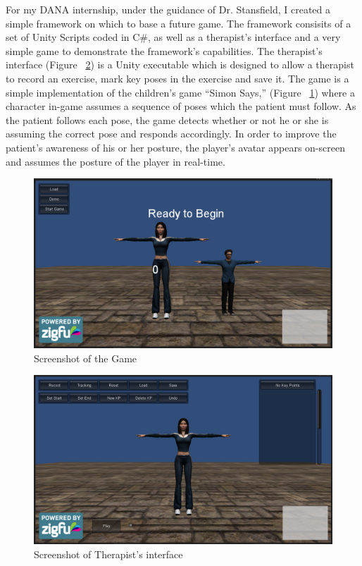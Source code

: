 \documentclass{report}
\begin{document}
For my DANA internship, under the guidance of Dr. Stansfield, I created a simple framework on which to base a future game. The framework consisits of a set of Unity Scripts coded in C\#, as well as a therapist's interface and a very simple game to demonstrate the framework's capabilities. The therapist's interface (Figure ~\ref{Gameshot2}) is a Unity executable which is designed to allow a therapist to record an exercise, mark key poses in the exercise and save it. The game is a simple implementation of the children's game ``Simon Says,'' (Figure ~\ref{Gameshot}) where a character in-game assumes a sequence of poses which the patient must follow. As the patient follows each pose, the game detects whether or not he or she is assuming the correct pose and responds accordingly. In order to improve the patient's awareness of his or her posture, the player's avatar appears on-screen and assumes the posture of the player in real-time.

\begin{figure}[htb]
	\includegraphics[width=\linewidth]{Game.png}
	\caption{Screenshot of the Game}
	\label{Gameshot}
\end{figure}

\begin{figure}[htb]
	\includegraphics[width=\linewidth]{TherapistsInt.png}
	\caption{Screenshot of Therapist's interface}
	\label{Gameshot2}
\end{figure}
\end{document}
